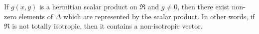 If $g(x, y)$ is a hermitian scalar product on $\Re$ and $g \neq 0$, then there exist non-zero elements of $\Delta$ which are represented by the scalar product. In other words, if $\Re$ is not totally isotropic, then it contains a non-isotropic vector.
